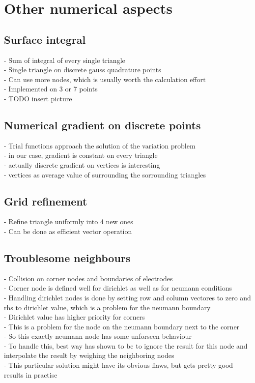 \documentclass[parskip=half, titlepage=yes, 12pt, BCOR=12mm, DIV=calc]{scrartcl}
\begin{document}
\newpage


\section{Other numerical aspects }


\subsection{Surface integral}
- Sum of integral of every single triangle \\
- Single triangle on discrete gauss quadrature points \\
- Can use more nodes, which is usually worth the calculation effort \\
- Implemented on 3 or 7 points \\
- TODO insert picture \\

\subsection{Numerical gradient on discrete points}
- Trial functions approach the solution of the variation problem \\
- in our case, gradient is constant on every triangle \\
- actually discrete gradient on vertices is interesting \\
- vertices as average value of surrounding the sorrounding triangles \\

\subsection{Grid refinement}
- Refine triangle uniformly into 4 new ones \\
- Can be done as efficient vector operation \\

\subsection{Troublesome neighbours}
- Collision on corner nodes and boundaries of electrodes \\
- Corner node is defined well for dirichlet as well as for neumann conditions \\
- Handling dirichlet nodes is done by setting row and column vectores to zero and rhs to dirichlet value, which is a problem for the neumann boundary  \\
- Dirichlet value has higher priority for corners \\
- This is a problem for the node on the neumann boundary next to the corner \\
- So this exactly neumann node has some unforseen behaviour \\
- To handle this, best way has shown to be to ignore the result for this node and interpolate the result by weighing the neighboring nodes \\  
- This particular solution might have its obvious flaws, but gets pretty good results in practise \\
\end{document}
